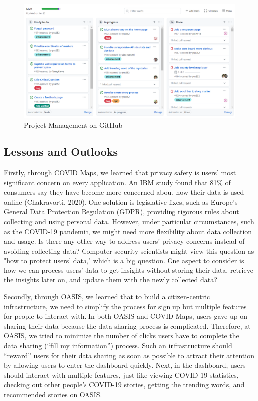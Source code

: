 \documentclass{ucsdreport}
\begin{document}
\begin{figure}[H]
    \centering
    \includegraphics[scale=0.5]{images/management.png}
    \caption{Project Management on GitHub}
\end{figure}


\subsection{Lessons and Outlooks}

Firstly, through COVID Maps, we learned that privacy safety is users' most 
significant concern on every application. An IBM study found that 81\% of 
consumers say they have become more concerned about how their data is used
online (Chakravorti, 2020). One solution is legislative fixes, such as 
Europe's General Data Protection Regulation (GDPR), providing rigorous rules
about collecting and using personal data. 
However, under particular circumstances, such as the
COVID-19 pandemic, we might need more flexibility about data collection and 
usage. Is there any other way to address users' privacy concerns instead of 
avoiding collecting data? Computer security scientists might view this question
as "how to protect users' data," which is a big question. One aspect to 
consider is how we can process users' data to get insights without storing 
their data, retrieve the insights later on, and update them with the newly
collected data?

Secondly, through OASIS, we learned that to build a citizen-centric 
infrastructure, we need to simplify the process for sign up but multiple
features for people to interact with. In both OASIS and COVID Maps, users 
gave up on sharing their data because the data sharing process is 
complicated. Therefore, at OASIS, we tried to minimize the number of clicks 
users have to complete the data sharing (“fill my information”) process. 
Such an infrastructure should “reward” users for their data sharing as soon 
as possible to attract their attention by allowing users to enter the 
dashboard quickly. Next, in the dashboard, users should interact with multiple
features, just like viewing COVID-19 statistics, checking out other people’s
COVID-19 stories, getting the trending words, and recommended stories on
OASIS. 
\end{document}
